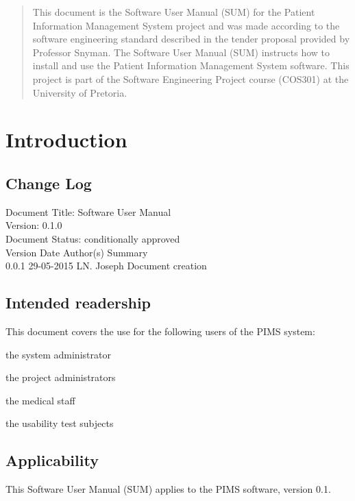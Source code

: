 \documentclass[14pt, a4paper]{article}
\begin{document}


\begin{abstract}
\Large
This document is the Software User Manual (SUM) for the Patient Information Management System project and was made according to the software engineering standard described in the tender proposal provided by Professor Snyman. The Software User Manual (SUM) instructs how to install and use the
Patient Information Management System software. This project is part of the Software Engineering Project course (COS301) at the University of Pretoria.\\
\end{abstract}

\newpage

\tableofcontents
\newpage

\section{Introduction}


\subsection{Change Log}
Document Title: Software User Manual\\
Version: 0.1.0\\
Document Status: conditionally approved\\
Version Date Author(s) Summary\\
0.0.1 29-05-2015 LN. Joseph Document creation\\


\subsection{Intended readership}
This document covers the use for the following users of the PIMS system:\\
\begin{description}
\item the system administrator
\item the project administrators
\item the medical staff
\item the usability test subjects
\end{description}

\subsection{Applicability}
This Software User Manual (SUM) applies to the PIMS software, version 0.1.\\
\end{document}
